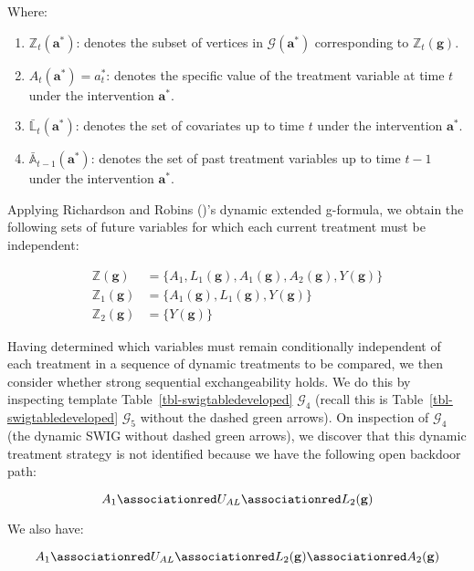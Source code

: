 \documentclass[
  single column]{article}
\providecommand{\tightlist}{%
  \setlength{\itemsep}{0pt}\setlength{\parskip}{0pt}}\usepackage{longtable,booktabs,array}
\begin{document}
Where:

\begin{enumerate}
\def\labelenumi{\arabic{enumi}.}
\tightlist
\item
  \textbf{\(\mathbb{Z}_t(\mathbf{a}^*)\)}: denotes the subset of
  vertices in \(\mathcal{G}(\mathbf{a}^*)\) corresponding to
  \(\mathbb{Z}_t(\mathbf{g})\).
\item
  \textbf{\(A_t(\mathbf{a}^*) = a^*_t\)}: denotes the specific value of
  the treatment variable at time \(t\) under the intervention
  \(\mathbf{a}^*\).
\item
  \textbf{\(\bar{\mathbb{L}}_t(\mathbf{a}^*)\)}: denotes the set of
  covariates up to time \(t\) under the intervention \(\mathbf{a}^*\).
\item
  \textbf{\(\bar{\mathbb{A}}_{t-1}(\mathbf{a}^*)\)}: denotes the set of
  past treatment variables up to time \(t-1\) under the intervention
  \(\mathbf{a}^*\).
\end{enumerate}

Applying Richardson and Robins ()'s
dynamic extended g-formula, we obtain the following sets of future
variables for which each current treatment must be independent:

\[
\begin{aligned}
\mathbb{Z}(\mathbf{g}) &= \{A_1, L_1(\mathbf{g}), A_1(\mathbf{g}), A_2(\mathbf{g}), Y(\mathbf{g})\} \\
\mathbb{Z}_1(\mathbf{g}) &= \{A_1(\mathbf{g}), L_1(\mathbf{g}), Y(\mathbf{g})\} \\
\mathbb{Z}_2(\mathbf{g}) &= \{Y(\mathbf{g})\}
\end{aligned}
\]

Having determined which variables must remain conditionally independent
of each treatment in a sequence of dynamic treatments to be compared, we
then consider whether strong sequential exchangeability holds. We do
this by inspecting template Table~\ref{tbl-swigtabledeveloped}
\(\mathcal{G}_4\) (recall this is Table~\ref{tbl-swigtabledeveloped}
\(\mathcal{G}_5\) without the dashed green arrows). On inspection of
\(\mathcal{G}_4\) (the dynamic SWIG without dashed green arrows), we
discover that this dynamic treatment strategy is not identified because
we have the following open backdoor path:

\[
A_1 \associationred U_{AL} \associationred L_2(\mathbf{g})
\]

We also have:

\[
A_1 \associationred U_{AL} \associationred L_2(\mathbf{g}) \associationred A_2(\mathbf{g})
\]
\end{document}

